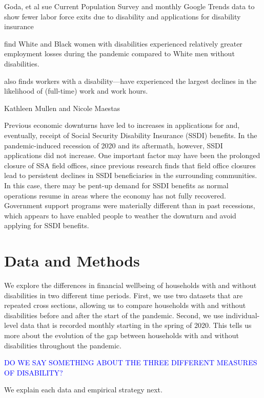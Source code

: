 \documentclass[12pt]{article}
\begin{document}
  Goda, et al sue Current Population Survey and monthly Google Trends data to show fewer labor force exits due to disability and applications for disability insurance \citep{goda2022impact}


\citeauthor{schur2021covid} find White and Black women with disabilities experienced relatively greater employment losses during the pandemic compared to White men without disabilities. \citep{schur2021covid}

   \cite{cowan2020short} also finds workers with a disability—have experienced the largest declines in the likelihood of (full-time) work and work hours.

  
Kathleen Mullen and Nicole Maestas
 
Previous economic downturns have led to increases in applications for and, eventually, receipt of Social Security Disability Insurance (SSDI) benefits. In the pandemic-induced recession of 2020 and its aftermath, however, SSDI applications did not increase. One important factor may have been the prolonged closure of SSA field offices, since previous research finds that field office closures lead to persistent declines in SSDI beneficiaries in the surrounding communities. In this case, there may be pent-up demand for SSDI benefits as normal operations resume in areas where the economy has not fully recovered. Government support programs were materially different than in past recessions, which appears to have enabled people to weather the downturn and avoid applying for SSDI benefits. \cite{mullen2022economic}

 


 
 
\section{Data and Methods}
We explore the differences in financial wellbeing of households with and without disabilities in two different time periods. First, we use two datasets that are repeated cross sections, allowing us to compare households with and without disabilities before and after the start of the pandemic. Second, we use individual-level data that is recorded monthly starting in the spring of 2020. This tells us more about the evolution of the gap between households with and without disabilities throughout the pandemic. 

\textcolor{blue}{DO WE SAY SOMETHING ABOUT THE THREE DIFFERENT MEASURES OF DISABILITY?}


We explain each data and empirical strategy next. 
\end{document}
